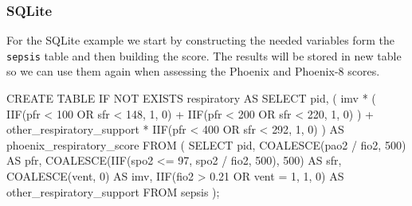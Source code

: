 \documentclass[
  letterpaper,
  DIV=11,
  numbers=noendperiod]{scrartcl}
\newenvironment{Shaded}{\begin{snugshade}}{\end{snugshade}}
\newcommand{\ControlFlowTok}[1]{\textcolor[rgb]{0.00,0.23,0.31}{#1}}
\newcommand{\DecValTok}[1]{\textcolor[rgb]{0.68,0.00,0.00}{#1}}
\newcommand{\FloatTok}[1]{\textcolor[rgb]{0.68,0.00,0.00}{#1}}
\newcommand{\FunctionTok}[1]{\textcolor[rgb]{0.28,0.35,0.67}{#1}}
\newcommand{\KeywordTok}[1]{\textcolor[rgb]{0.00,0.23,0.31}{#1}}
\newcommand{\NormalTok}[1]{\textcolor[rgb]{0.00,0.23,0.31}{#1}}
\newcommand{\OperatorTok}[1]{\textcolor[rgb]{0.37,0.37,0.37}{#1}}
\begin{document}
\subsubsection{SQLite}\label{sqlite}

For the SQLite example we start by constructing the needed variables
form the \texttt{sepsis} table and then building the score. The results
will be stored in new table so we can use them again when assessing the
Phoenix and Phoenix-8 scores.

\begin{Shaded}
\begin{Highlighting}[]
\KeywordTok{CREATE} \KeywordTok{TABLE} \ControlFlowTok{IF} \KeywordTok{NOT} \KeywordTok{EXISTS}\NormalTok{ respiratory }\KeywordTok{AS}
  \KeywordTok{SELECT}
\NormalTok{    pid,}
\NormalTok{    (}
\NormalTok{      imv }\OperatorTok{*}\NormalTok{ (}
\NormalTok{        IIF(pfr }\OperatorTok{\textless{}} \DecValTok{100} \KeywordTok{OR}\NormalTok{ sfr }\OperatorTok{\textless{}} \DecValTok{148}\NormalTok{, }\DecValTok{1}\NormalTok{, }\DecValTok{0}\NormalTok{) }\OperatorTok{+}\NormalTok{ IIF(pfr }\OperatorTok{\textless{}} \DecValTok{200} \KeywordTok{OR}\NormalTok{ sfr }\OperatorTok{\textless{}} \DecValTok{220}\NormalTok{, }\DecValTok{1}\NormalTok{, }\DecValTok{0}\NormalTok{)}
\NormalTok{      ) }\OperatorTok{+}
\NormalTok{      other\_respiratory\_support }\OperatorTok{*}\NormalTok{ IIF(pfr }\OperatorTok{\textless{}} \DecValTok{400} \KeywordTok{OR}\NormalTok{ sfr }\OperatorTok{\textless{}} \DecValTok{292}\NormalTok{, }\DecValTok{1}\NormalTok{, }\DecValTok{0}\NormalTok{)}
\NormalTok{    ) }\KeywordTok{AS}\NormalTok{ phoenix\_respiratory\_score}
  \KeywordTok{FROM}
\NormalTok{  (}
    \KeywordTok{SELECT}
\NormalTok{      pid,}
      \FunctionTok{COALESCE}\NormalTok{(pao2 }\OperatorTok{/}\NormalTok{ fio2, }\DecValTok{500}\NormalTok{) }\KeywordTok{AS}\NormalTok{ pfr,}
      \FunctionTok{COALESCE}\NormalTok{(IIF(spo2 }\OperatorTok{\textless{}=} \DecValTok{97}\NormalTok{, spo2 }\OperatorTok{/}\NormalTok{ fio2, }\DecValTok{500}\NormalTok{), }\DecValTok{500}\NormalTok{) }\KeywordTok{AS}\NormalTok{ sfr,}
      \FunctionTok{COALESCE}\NormalTok{(vent, }\DecValTok{0}\NormalTok{) }\KeywordTok{AS}\NormalTok{ imv,}
\NormalTok{      IIF(fio2 }\OperatorTok{\textgreater{}} \FloatTok{0.21} \KeywordTok{OR}\NormalTok{ vent }\OperatorTok{=} \DecValTok{1}\NormalTok{, }\DecValTok{1}\NormalTok{, }\DecValTok{0}\NormalTok{) }\KeywordTok{AS}\NormalTok{ other\_respiratory\_support}
    \KeywordTok{FROM}\NormalTok{ sepsis}
\NormalTok{  );}
\end{Highlighting}
\end{Shaded}
\end{document}
